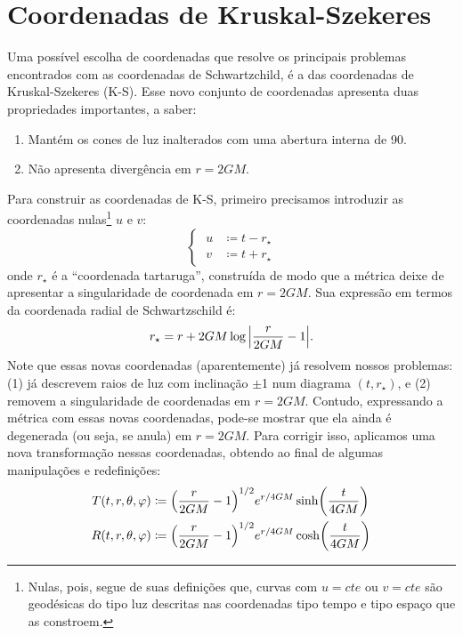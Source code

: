 \documentclass[12pt, a4paper]{article}
\theoremstyle{meuremarkstyle}
\theoremstyle{definicao}
\begin{document}
\section{Coordenadas de Kruskal-Szekeres}
Uma possível escolha de coordenadas que resolve os principais problemas encontrados com as coordenadas
de Schwartzchild, é a das coordenadas de Kruskal-Szekeres (K-S). Esse novo conjunto de coordenadas apresenta
duas propriedades importantes, a saber:
\begin{enumerate}[label=\arabic*., leftmargin=2.5em]
  \item Mantém os cones de luz inalterados com uma abertura interna de 90\degree.
  \item Não apresenta divergência em $r = 2GM$.
\end{enumerate}
Para construir as coordenadas de K-S, primeiro precisamos introduzir as coordenadas nulas\footnote{Nulas, pois, segue de suas definições que, curvas com $u=cte$ ou $v=cte$ são geodésicas do tipo luz descritas nas coordenadas tipo tempo e tipo espaço que as constroem.} $u$ e $v$:
%
\[
\left\{\;
\begin{aligned}
    u &\coloneq t - r_\star\\
    v &\coloneq t + r_\star
  \end{aligned}
\right.
\]
%
onde $r_\star$ é a \enquote{coordenada tartaruga}, construída de modo que a métrica deixe de apresentar a singularidade de coordenada em $r = 2GM$. Sua expressão em termos da coordenada radial de Schwartzschild é:
\begin{equation*}
  r_\star = r + 2GM\log\qty|\frac{r}{2GM}-1|.
\end{equation*}
Note que essas novas coordenadas (aparentemente) já resolvem nossos problemas: (1) já descrevem raios de luz com inclinação $\pm$1 num diagrama $(t,r_\star)$, e (2) removem a singularidade de coordenadas em $r = 2GM$.
Contudo, expressando a métrica com essas novas coordenadas, pode-se mostrar que ela ainda é degenerada (ou seja, se anula) em $r = 2GM$.
Para corrigir isso, aplicamos uma nova transformação nessas coordenadas, obtendo ao final de algumas manipulações e redefinições:
\begin{align*}
T(t,r,\theta,\varphi) &\coloneq \qty(\frac{r}{2GM}-1)^{1/2} e^{r/4GM}\sinh(\frac{t}{4GM})\\
R(t,r,\theta,\varphi) &\coloneq \qty(\frac{r}{2GM}-1)^{1/2} e^{r/4GM}\cosh(\frac{t}{4GM})
\end{align*}
\end{document}
